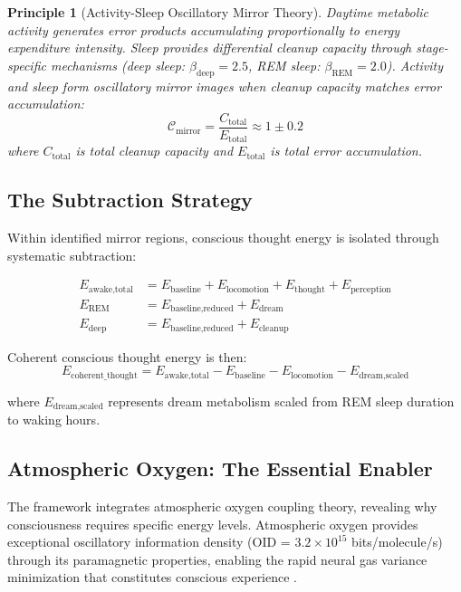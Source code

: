 \documentclass[12pt,twocolumn]{article}
\newtheorem{principle}[theorem]{Principle}
\theoremstyle{remark}
\begin{document}
\begin{principle}[Activity-Sleep Oscillatory Mirror Theory]
Daytime metabolic activity generates error products accumulating proportionally to energy expenditure intensity. Sleep provides differential cleanup capacity through stage-specific mechanisms (deep sleep: $\beta_{\text{deep}} = 2.5$, REM sleep: $\beta_{\text{REM}} = 2.0$). Activity and sleep form oscillatory mirror images when cleanup capacity matches error accumulation:
\begin{equation}
\mathcal{C}_{\text{mirror}} = \frac{C_{\text{total}}}{E_{\text{total}}} \approx 1 \pm 0.2
\end{equation}
where $C_{\text{total}}$ is total cleanup capacity and $E_{\text{total}}$ is total error accumulation.
\end{principle}

\subsection{The Subtraction Strategy}

Within identified mirror regions, conscious thought energy is isolated through systematic subtraction:

\begin{align}
E_{\text{awake,total}} &= E_{\text{baseline}} + E_{\text{locomotion}} + E_{\text{thought}} + E_{\text{perception}} \\
E_{\text{REM}} &= E_{\text{baseline,reduced}} + E_{\text{dream}} \\
E_{\text{deep}} &= E_{\text{baseline,reduced}} + E_{\text{cleanup}}
\end{align}

Coherent conscious thought energy is then:
\begin{equation}
\boxed{E_{\text{coherent\_thought}} = E_{\text{awake,total}} - E_{\text{baseline}} - E_{\text{locomotion}} - E_{\text{dream,scaled}}}
\label{eq:thought_subtraction}
\end{equation}

where $E_{\text{dream,scaled}}$ represents dream metabolism scaled from REM sleep duration to waking hours.

\subsection{Atmospheric Oxygen: The Essential Enabler}

The framework integrates atmospheric oxygen coupling theory, revealing why consciousness requires specific energy levels. Atmospheric oxygen provides exceptional oscillatory information density (OID = $3.2 \times 10^{15}$ bits/molecule/s) through its paramagnetic properties, enabling the rapid neural gas variance minimization that constitutes conscious experience \citep{sachikonye2024atmospheric}.
\end{document}

